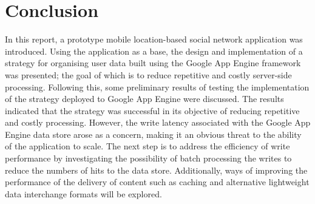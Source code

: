 \documentclass{article}
\begin{document}

\section{Conclusion} %
\label{sec:conclusion}

In this report, a prototype mobile location-based social network application was introduced. Using the application as a base, the design and implementation of a strategy for organising user data built using the Google App Engine framework was presented; the goal of which is to reduce repetitive and costly server-side processing. Following this, some preliminary results of testing the implementation of the strategy deployed to Google App Engine were discussed. The results indicated that the strategy was successful in its objective of reducing repetitive and costly processing. However, the write latency associated with  the Google App Engine data store arose as a concern, making it an obvious threat to the ability of the application to scale. The next step is to address the efficiency of write performance by investigating the possibility of batch processing the writes to reduce the numbers of hits to the data store. Additionally, ways of improving the performance of the delivery of content such as caching and alternative lightweight data interchange formats will be explored.

\end{document}

